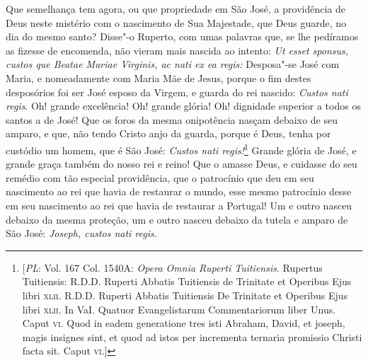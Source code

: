 Que semelhança tem agora, ou que propriedade em São José, a providência
de Deus neste mistério com o nascimento de Sua Majestade, que Deus
guarde, no dia do mesmo santo? Disse"-o Ruperto, com umas palavras que,
se lhe pedíramos as fizesse de encomenda, não vieram mais nascida ao
intento: \emph{Ut esset sponsus, custos que Beatae Mariae Virginis, ac
nati ex ea regis:} Desposa"-se José com Maria, e nomeadamente com Maria
Mãe de Jesus, porque o fim destes desposórios foi ser José esposo da
Virgem, e guarda do rei
nascido: \emph{Custos nati regis}. Oh! grande excelência! Oh! grande
glória! Oh! dignidade superior a todos os santos a de José! Que os foros
da mesma onipotência nasçam debaixo de seu amparo, e que, não tendo
Cristo anjo da guarda, porque é Deus, tenha por custódio um homem, que é
São José: \emph{Custos nati regis!}\footnote{[\textit{PL}: Vol. 167 Col. 1540A: \textit{Opera Omnia Ruperti Tuitiensis}. Rupertus Tuitiensis: R.D.D. Ruperti Abbatis Tuitiensis de Trinitate et Operibus Ejus libri \textsc{xlii}. R.D.D. Ruperti Abbatis Tuitiensis De Trinitate et Operibus Ejus libri \textsc{xlii}. In VaI. Quatuor Evangelistarum Commentariorum liber Unus. Caput \textsc{vi}. Quod in eadem generatione tres isti Abraham, David, et joseph, magis insignes sint, et quod ad istos per incrementa ternaria promissio Christi facta sit. Caput \textsc{vi}.]} Grande glória de José, e grande
graça também do nosso rei e reino! Que o amasse Deus, e cuidasse do seu
remédio com tão especial providência, que o patrocínio que deu em seu
nascimento ao rei que havia de restaurar o mundo, esse mesmo patrocínio
desse em seu nascimento ao rei que havia de restaurar a Portugal! Um e
outro nasceu debaixo da mesma proteção, um e outro nasceu debaixo da
tutela e amparo de São José: \emph{Joseph, custos nati regis.}

